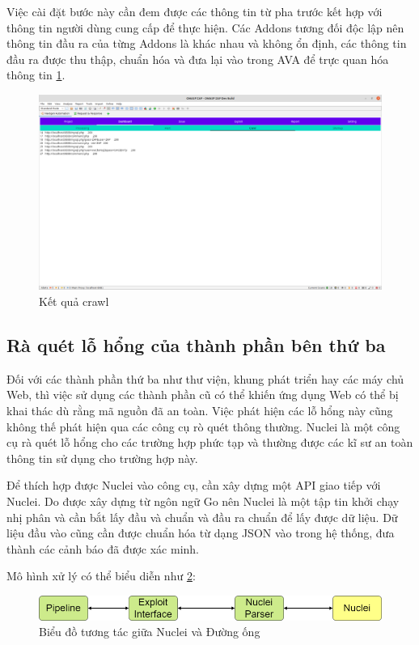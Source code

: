\documentclass[./../main.tex]{subfiles}
\begin{document}
Việc cài đặt bước này cần đem được các thông tin từ pha trước kết hợp
với thông tin người dùng cung cấp để thực hiện. Các Addons tương đối độc
lập nên thông tin đầu ra của từng Addons là khác nhau và không ổn định,
các thông tin đầu ra được thu thập, chuẩn hóa và đưa lại vào trong AVA
để trực quan hóa thông tin \ref{fig:scan_result}.

\begin{figure}[ht!]
	\includegraphics[width=\linewidth]{./images/scan_result.png}
	\caption{Kết quả crawl}
	\label{fig:scan_result}
\end{figure}

\subsection{Rà quét lỗ hổng của thành phần bên thứ ba}

Đối với các thành phần thứ ba như thư viện, khung phát triển hay các máy chủ Web,
thì việc sử dụng các thành phần cũ có thể khiến ứng dụng Web có thể bị khai thác
dù rằng mã nguồn đã an toàn. Việc phát hiện các lỗ hổng này cũng không thế  phát
hiện qua các công cụ rò quét thông thường. Nuclei là một công cụ rà quét lỗ hổng
cho các trường hợp phức tạp và thường được các kĩ sư an toàn thông tin sử dụng cho
trường hợp này.

Để thích hợp được Nuclei vào công cụ, cần xây dựng một API giao tiếp với Nuclei. Do
được xây dựng từ ngôn ngữ Go nên Nuclei là một tập tin khởi chạy nhị phân và cần bắt
lấy đầu và chuẩn và đầu ra chuẩn để lấy được dữ liệu. Dữ liệu đầu vào cũng cần được
chuẩn hóa từ dạng JSON vào trong hệ thống, đưa thành các cảnh báo đã được xác minh.

Mô hình xử lý có thể biểu diễn như \ref{fig:nuclei}:

\begin{figure}[ht!]
	\includegraphics[width=\linewidth]{./images/nuclei.png}
	\caption{Biểu đồ tương tác giữa Nuclei và Đường ống}
	\label{fig:nuclei}
\end{figure}
\end{document}
